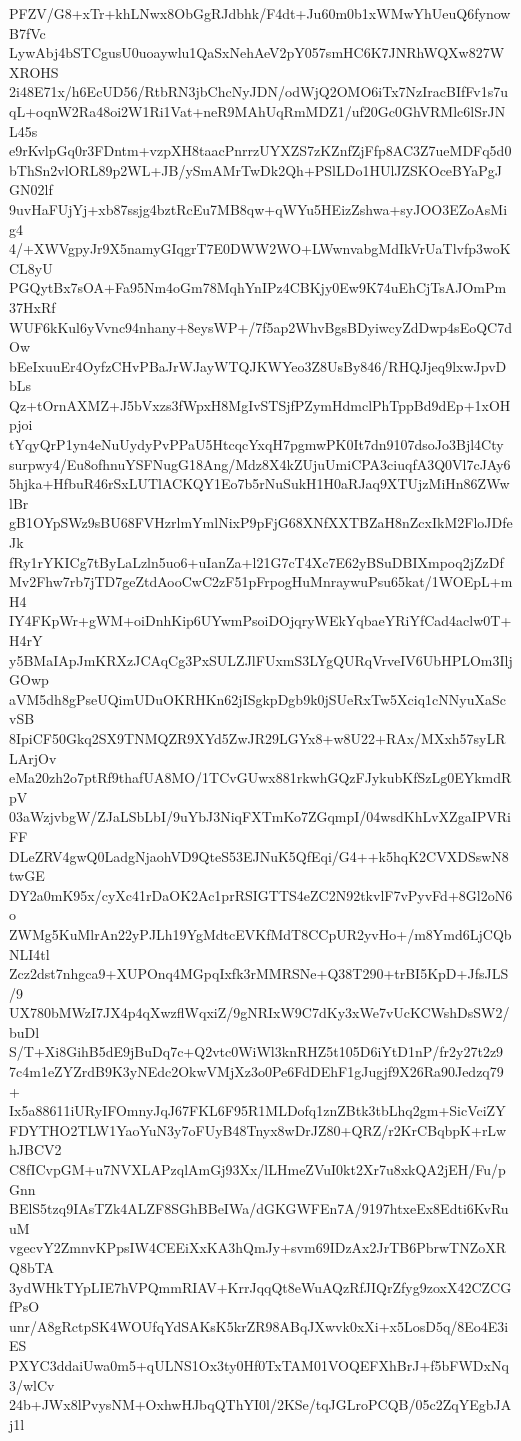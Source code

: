 PFZV/G8+xTr+khLNwx8ObGgRJdbhk/F4dt+Ju60m0b1xWMwYhUeuQ6fynowB7fVc
LywAbj4bSTCgusU0uoaywlu1QaSxNehAeV2pY057smHC6K7JNRhWQXw827WXROHS
2i48E71x/h6EcUD56/RtbRN3jbChcNyJDN/odWjQ2OMO6iTx7NzIracBIfFv1s7u
qL+oqnW2Ra48oi2W1Ri1Vat+neR9MAhUqRmMDZ1/uf20Gc0GhVRMlc6lSrJNL45s
e9rKvlpGq0r3FDntm+vzpXH8taacPnrrzUYXZS7zKZnfZjFfp8AC3Z7ueMDFq5d0
bThSn2vlORL89p2WL+JB/ySmAMrTwDk2Qh+PSlLDo1HUlJZSKOceBYaPgJGN02lf
9uvHaFUjYj+xb87ssjg4bztRcEu7MB8qw+qWYu5HEizZshwa+syJOO3EZoAsMig4
4/+XWVgpyJr9X5namyGIqgrT7E0DWW2WO+LWwnvabgMdIkVrUaTlvfp3woKCL8yU
PGQytBx7sOA+Fa95Nm4oGm78MqhYnIPz4CBKjy0Ew9K74uEhCjTsAJOmPm37HxRf
WUF6kKul6yVvnc94nhany+8eysWP+/7f5ap2WhvBgsBDyiwcyZdDwp4sEoQC7dOw
bEeIxuuEr4OyfzCHvPBaJrWJayWTQJKWYeo3Z8UsBy846/RHQJjeq9lxwJpvDbLs
Qz+tOrnAXMZ+J5bVxzs3fWpxH8MgIvSTSjfPZymHdmclPhTppBd9dEp+1xOHpjoi
tYqyQrP1yn4eNuUydyPvPPaU5HtcqcYxqH7pgmwPK0It7dn9107dsoJo3Bjl4Cty
surpwy4/Eu8ofhnuYSFNugG18Ang/Mdz8X4kZUjuUmiCPA3ciuqfA3Q0Vl7cJAy6
5hjka+HfbuR46rSxLUTlACKQY1Eo7b5rNuSukH1H0aRJaq9XTUjzMiHn86ZWwlBr
gB1OYpSWz9sBU68FVHzrlmYmlNixP9pFjG68XNfXXTBZaH8nZcxIkM2FloJDfeJk
fRy1rYKICg7tByLaLzln5uo6+uIanZa+l21G7cT4Xc7E62yBSuDBIXmpoq2jZzDf
Mv2Fhw7rb7jTD7geZtdAooCwC2zF51pFrpogHuMnraywuPsu65kat/1WOEpL+mH4
IY4FKpWr+gWM+oiDnhKip6UYwmPsoiDOjqryWEkYqbaeYRiYfCad4aclw0T+H4rY
y5BMaIApJmKRXzJCAqCg3PxSULZJlFUxmS3LYgQURqVrveIV6UbHPLOm3IljGOwp
aVM5dh8gPseUQimUDuOKRHKn62jISgkpDgb9k0jSUeRxTw5Xciq1cNNyuXaScvSB
8IpiCF50Gkq2SX9TNMQZR9XYd5ZwJR29LGYx8+w8U22+RAx/MXxh57syLRLArjOv
eMa20zh2o7ptRf9thafUA8MO/1TCvGUwx881rkwhGQzFJykubKfSzLg0EYkmdRpV
03aWzjvbgW/ZJaLSbLbI/9uYbJ3NiqFXTmKo7ZGqmpI/04wsdKhLvXZgaIPVRiFF
DLeZRV4gwQ0LadgNjaohVD9QteS53EJNuK5QfEqi/G4++k5hqK2CVXDSswN8twGE
DY2a0mK95x/cyXc41rDaOK2Ac1prRSIGTTS4eZC2N92tkvlF7vPyvFd+8Gl2oN6o
ZWMg5KuMlrAn22yPJLh19YgMdtcEVKfMdT8CCpUR2yvHo+/m8Ymd6LjCQbNLI4tl
Zcz2dst7nhgca9+XUPOnq4MGpqIxfk3rMMRSNe+Q38T290+trBI5KpD+JfsJLS/9
UX780bMWzI7JX4p4qXwzflWqxiZ/9gNRIxW9C7dKy3xWe7vUcKCWshDsSW2/buDl
S/T+Xi8GihB5dE9jBuDq7c+Q2vtc0WiWl3knRHZ5t105D6iYtD1nP/fr2y27t2z9
7c4m1eZYZrdB9K3yNEdc2OkwVMjXz3o0Pe6FdDEhF1gJugjf9X26Ra90Jedzq79+
Ix5a88611iURyIFOmnyJqJ67FKL6F95R1MLDofq1znZBtk3tbLhq2gm+SicVciZY
FDYTHO2TLW1YaoYuN3y7oFUyB48Tnyx8wDrJZ80+QRZ/r2KrCBqbpK+rLwhJBCV2
C8fICvpGM+u7NVXLAPzqlAmGj93Xx/lLHmeZVuI0kt2Xr7u8xkQA2jEH/Fu/pGnn
BElS5tzq9IAsTZk4ALZF8SGhBBeIWa/dGKGWFEn7A/9197htxeEx8Edti6KvRuuM
vgecvY2ZmnvKPpsIW4CEEiXxKA3hQmJy+svm69IDzAx2JrTB6PbrwTNZoXRQ8bTA
3ydWHkTYpLIE7hVPQmmRIAV+KrrJqqQt8eWuAQzRfJIQrZfyg9zoxX42CZCGfPsO
unr/A8gRctpSK4WOUfqYdSAKsK5krZR98ABqJXwvk0xXi+x5LosD5q/8Eo4E3iES
PXYC3ddaiUwa0m5+qULNS1Ox3ty0Hf0TxTAM01VOQEFXhBrJ+f5bFWDxNq3/wlCv
24b+JWx8lPvysNM+OxhwHJbqQThYI0l/2KSe/tqJGLroPCQB/05c2ZqYEgbJAj1l
